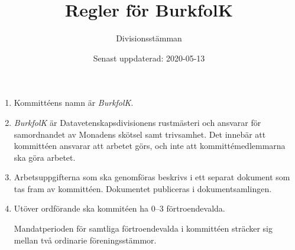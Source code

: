 \documentclass{dvd}
\begin{document}
	\title{Regler för BurkfolK}
	\author{Divisionsstämman}
	\date{Senast uppdaterad: 2020-05-13}

	\begin{enumerate}[label=\arabic* §, ref=\arabic*]

		\item Kommittéens namn är \emph{BurkfolK}.
		
		\item \emph{BurkfolK} är Datavetenskapsdivisionens rustmästeri och ansvarar för samordnandet av Monadens skötsel samt trivsamhet.
		Det innebär att kommittéen ansvarar att arbetet görs, och inte att kommittémedlemmarna ska göra arbetet.
		
		\item Arbetsuppgifterna som ska genomföras beskrivs i ett separat dokument som tas fram av kommittéen.
		Dokumentet publiceras i dokumentsamlingen.
		
		\item Utöver ordförande ska kommitéen ha 0--3 förtroendevalda.
		
		Mandatperioden för samtliga förtroendevalda i kommittéen sträcker sig mellan två ordinarie föreningsstämmor.
	\end{enumerate}
\end{document}

